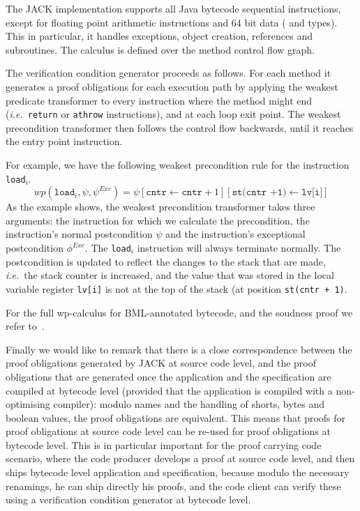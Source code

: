 The JACK implementation supports all Java bytecode sequential
instructions, except for floating point arithmetic instructions and 64
bit data ( and  types). This in particular, it
handles exceptions, object creation, references and subroutines. The
calculus is defined over the method control flow graph.


The verification condition generator proceeds as follows. For each
method it generates a proof obligations for each execution path by
applying the weakest predicate transformer to every instruction where
the method might end (\emph{i.e.}\ \texttt{return} or \texttt{athrow}
instructions), and at each loop exit point. The weakest precondition
transformer then follows the control flow backwards, until it reaches
the entry point instruction. 

For example, we have the following weakest precondition rule for the
instruction \texttt{load\(_i\)}.
\[
\mathit{wp}(\texttt{load}_i, \psi, \psi^{\mathit{Exc}})  = 
\psi[\texttt{cntr} \leftarrow \texttt{cntr} + 1][\texttt{st(cntr +1)}
\leftarrow \texttt{lv[i]}]
\]
As the example shows, the weakest precondition transformer takes three
arguments: the instruction for which we calculate the precondition,
the instruction's normal postcondition $\psi$ and the instruction's
exceptional postcondition $\phi^{\mathit{Exc}}$. The
\texttt{load}\(_i\) instruction will always terminate normally. The
postcondition is updated to reflect the changes to the stack that are
made, \emph{i.e.}\ the stack counter is increased, and the value that
was stored in the local variable register \texttt{lv[i]} is not at the
top of the stack (at position
\texttt{st(cntr + 1)}. 

For the full wp-calculus for BML-annotated bytecode, and the soudness
proof we refer to~\cite{Pavlova:phd}. 

Finally we would like to remark that there is a close correspondence
between the proof obligations generated by JACK at source code level,
and the proof obligations that are generated once the application and
the specification are compiled at bytecode level (provided that the
application is compiled with a non-optimising compiler): modulo names
and the handling of shorts, bytes and boolean values, the proof
obligations are equivalent. This means that proofs for proof
obligations at source code level can be re-used for proof obligations
at bytecode level. This is in particular important for the proof
carrying code scenario, where the code producer develops a proof at
source code level, and then ships bytecode level application and
specification, because modulo the necessary renamings, he can ship
directly his proofs, and the code client can verify these using a
verification condition generator at bytecode level.


